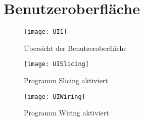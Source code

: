 \section{Benutzeroberfläche}
\begin{figure}
	\centering
	\texttt{[image: UI1]}
	\caption{Übersicht der Benutzeroberfläche}
	\label{fig:UI1}
\end{figure}

\begin{figure}
	\centering
	\texttt{[image: UISlicing]}
	\caption{Programm Slicing aktiviert}
	\label{fig:UISlicing}
\end{figure}

\begin{figure}
	\centering
	\texttt{[image: UIWiring]}
	\caption{Programm Wiring aktiviert}
	\label{fig:UIWiring}
\end{figure}